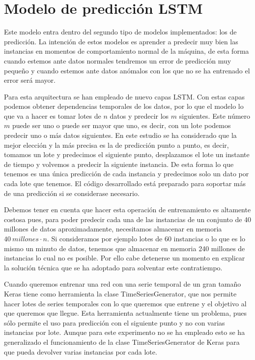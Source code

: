 \section{Modelo de predicción LSTM}

Este modelo entra dentro del segundo tipo de modelos implementados: los de predicción. La intención de estos modelos es aprender a predecir muy bien las instancias en momentos de comportamiento normal de la máquina, de esta forma cuando estemos ante datos normales tendremos un error de predicción muy pequeño y cuando estemos ante datos anómalos con los que no se ha entrenado el error será mayor.

Para esta arquitectura se han empleado de nuevo capas LSTM. Con estas capas podemos obtener dependencias temporales de los datos, por lo que el modelo lo que va a hacer es tomar lotes de $n$ datos y predecir los $m$ siguientes. Este número $m$ puede ser uno o puede ser mayor que uno, es decir, con un lote podemos predecir uno o más datos siguientes. En este estudio se ha considerado que la mejor elección y la más precisa es la de predicción punto a punto, es decir, tomamos un lote y predecimos el siguiente punto, desplazamos el lote un instante de tiempo y volvemos a predecir la siguiente instancia. De esta forma lo que tenemos es una única predicción de cada instancia y predecimos solo un dato por cada lote que tenemos. El código desarrollado está preparado para soportar más de una predicción si se considerase necesario.

Debemos tener en cuenta que hacer esta operación de entrenamiento es altamente costosa pues, para poder predecir cada una de las instancias de un conjunto de 40 millones de datos aproximadamente, necesitamos almacenar en memoria $40 \ millones \cdot n$. Si consideramos por ejemplo lotes de 60 instancias o lo que es lo mismo un minuto de datos, tenemos que almacenar en memoria 240 millones de instancias lo cual no es posible. Por ello cabe detenerse un momento en explicar la solución técnica que se ha adoptado para solventar este contratiempo.

Cuando queremos entrenar una red con una serie temporal de un gran tamaño Keras tiene como herramienta la clase TimeSeriesGenerator, que nos permite hacer lotes de series temporales con lo que queremos que entrene y el objetivo al que queremos que llegue. Esta herramienta actualmente tiene un problema, pues sólo permite el uso para predicción con el siguiente punto y no con varias instancias por lote. Aunque para este experimento no se ha empleado esto se ha generalizado el funcionamiento de la clase TimeSeriesGenerator de Keras para que pueda devolver varias instancias por cada lote.

